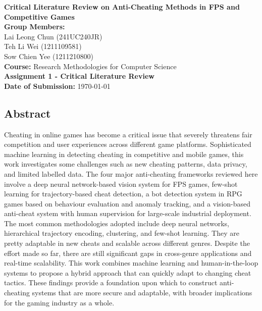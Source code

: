 \documentclass[a4paper, 12pt]{article}
\begin{document}
\begin{titlepage}
\centering
    \vspace*{2in}

    \Huge
    \textbf{Critical Literature Review on Anti-Cheating Methods in FPS and Competitive Games} \\[1.5cm]

    \Large
    \textbf{Group Members:} \\
    Lai Leong Chun (241UC240JR) \\
    Teh Li Wei (1211109581) \\
    Sow Chien Yee (1211210800) \\[1.5cm]

    \textbf{Course:} Research Methodologies for Computer Science \\[0.5cm]
    \textbf{Assignment 1 - Critical Literature Review} \\[1.5cm]

    \textbf{Date of Submission:} \today \\[3cm]

    \vfill %
\end{titlepage}

\newpage
\begin{center}
    \section*{Abstract} %
\end{center}
Cheating in online games has become a critical issue that severely threatens fair competition and user experiences across different game platforms. Sophisticated machine learning in detecting cheating in competitive and mobile games, this work investigates some challenges such as new cheating patterns, data privacy, and limited labelled data. The four major anti-cheating frameworks reviewed here involve a deep neural network-based vision system for FPS games, few-shot learning for trajectory-based cheat detection, a bot detection system in RPG games based on behaviour evaluation and anomaly tracking, and a vision-based anti-cheat system with human supervision for large-scale industrial deployment. The most common methodologies adopted include deep neural networks, hierarchical trajectory encoding, clustering, and few-shot learning. They are pretty adaptable in new cheats and scalable across different genres. Despite the effort made so far, there are still significant gaps in cross-genre applications and real-time scalability. This work combines machine learning and human-in-the-loop systems to propose a hybrid approach that can quickly adapt to changing cheat tactics. These findings provide a foundation upon which to construct anti-cheating systems that are more secure and adaptable, with broader implications for the gaming industry as a whole.
\end{document}
